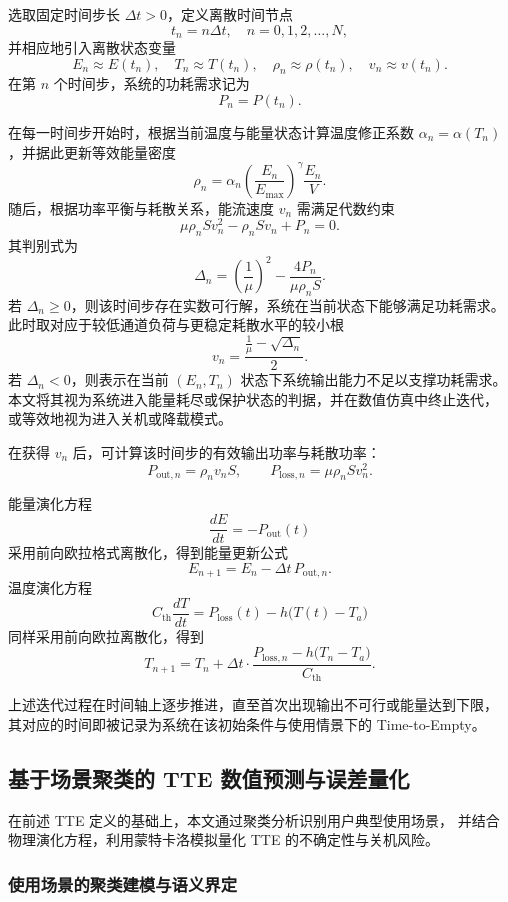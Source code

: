 \documentclass[11pt]{article}
\begin{document}
选取固定时间步长 $\Delta t>0$，定义离散时间节点
\[
t_n = n\Delta t, \quad n=0,1,2,\dots,N,
\]
并相应地引入离散状态变量
\[
E_n \approx E(t_n), \quad
T_n \approx T(t_n), \quad
\rho_n \approx \rho(t_n), \quad
v_n \approx v(t_n).
\]
在第 $n$ 个时间步，系统的功耗需求记为
\[
P_n = P(t_n).
\]

在每一时间步开始时，根据当前温度与能量状态计算温度修正系数
$\alpha_n=\alpha(T_n)$，并据此更新等效能量密度
\[
\rho_n
=
\alpha_n
\left( \frac{E_n}{E_{\max}} \right)^{\gamma}
\frac{E_n}{V}.
\]
随后，根据功率平衡与耗散关系，能流速度 $v_n$ 需满足代数约束
\[
\mu \rho_n S v_n^2
-
\rho_n S v_n
+
P_n
=0.
\]
其判别式为
\[
\Delta_n
=
\left(\frac{1}{\mu}\right)^2
-
\frac{4P_n}{\mu\rho_n S}.
\]
若 $\Delta_n \ge 0$，则该时间步存在实数可行解，系统在当前状态下能够满足功耗需求。
此时取对应于较低通道负荷与更稳定耗散水平的较小根
\[
v_n
=
\frac{\frac{1}{\mu}-\sqrt{\Delta_n}}{2}.
\]
若 $\Delta_n < 0$，则表示在当前 $(E_n,T_n)$ 状态下系统输出能力不足以支撑功耗需求。
本文将其视为系统进入能量耗尽或保护状态的判据，并在数值仿真中终止迭代，
或等效地视为进入关机或降载模式。

在获得 $v_n$ 后，可计算该时间步的有效输出功率与耗散功率：
\[
P_{\mathrm{out},n} = \rho_n v_n S, \qquad
P_{\mathrm{loss},n} = \mu \rho_n S v_n^2.
\]

能量演化方程
\[
\frac{dE}{dt} = -P_{\mathrm{out}}(t)
\]
采用前向欧拉格式离散化，得到能量更新公式
\[
E_{n+1}
=
E_n - \Delta t\, P_{\mathrm{out},n}.
\]
温度演化方程
\[
C_{\mathrm{th}}\frac{dT}{dt}
=
P_{\mathrm{loss}}(t)
-
h\bigl(T(t)-T_a\bigr)
\]
同样采用前向欧拉离散化，得到
\[
T_{n+1}
=
T_n
+
\Delta t \cdot
\frac{P_{\mathrm{loss},n}
-
h\bigl(T_n-T_a\bigr)}{C_{\mathrm{th}}}.
\]

上述迭代过程在时间轴上逐步推进，直至首次出现输出不可行或能量达到下限，
其对应的时间即被记录为系统在该初始条件与使用情景下的 Time-to-Empty。




\subsection{基于场景聚类的 TTE 数值预测与误差量化}

在前述 TTE 定义的基础上，本文通过聚类分析识别用户典型使用场景，
并结合物理演化方程，利用蒙特卡洛模拟量化 TTE 的不确定性与关机风险。

\subsubsection{使用场景的聚类建模与语义界定}
\end{document}
